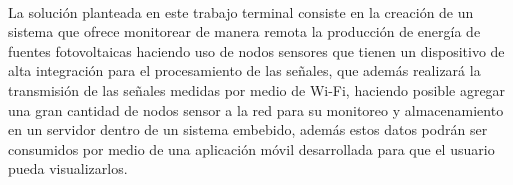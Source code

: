 \paragraph{}
La solución planteada en este trabajo terminal consiste en la creación de un sistema que ofrece monitorear de manera remota la producción de energía de fuentes fotovoltaicas haciendo uso de nodos sensores que tienen un dispositivo de alta integración para el procesamiento de las señales, que además realizará la transmisión de las señales medidas por medio de Wi-Fi, haciendo posible agregar una gran cantidad de nodos sensor a la red para su monitoreo y almacenamiento en un servidor dentro de un sistema embebido, además estos datos podrán ser consumidos por medio de una aplicación móvil desarrollada para que el usuario pueda visualizarlos.